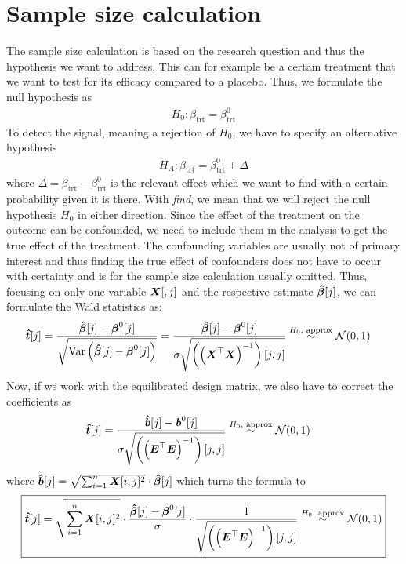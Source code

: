 \documentclass[11pt,a4paper,twoside]{book}\usepackage[]{graphicx}\usepackage[]{xcolor}
\begin{document}
\section{Sample size calculation}
The sample size calculation is based on the research question and thus the hypothesis we want to address. This can for example be a certain treatment that we want to test for its efficacy compared to a placebo. Thus, we formulate the null hypothesis as
\begin{align*}
H_0:\beta_\text{trt}=\beta_\text{trt}^0
\end{align*}
To detect the signal, meaning a rejection of $H_0$, we have to specify an alternative hypothesis
\begin{align*}
H_A:\beta_\text{trt}=\beta_\text{trt}^0+\Delta
\end{align*}
where $\Delta=\beta_\text{trt}-\beta_\text{trt}^0$ is the relevant effect which we want to find with a certain probability given it is there.
With \textit{find}, we mean that we will reject the null hypothesis $H_0$ in either direction. Since the effect of the treatment on the outcome can be confounded, we need to include them in the analysis to get the true effect of the treatment. The confounding variables are usually not of primary interest and thus finding the true effect of confounders does not have to occur with certainty and is for the sample size calculation usually omitted. Thus, focusing on only one variable ${\boldsymbol{X}}[,j]$ and the respective estimate ${\boldsymbol{\hat\beta}}[j]$, we can formulate the Wald statistics as:
\begin{align*}
{\boldsymbol{\hat{t}}}[j]&=\frac{{\boldsymbol{\hat\beta}}[j] - {\boldsymbol{\beta}}^0[j]}{\sqrt{\operatorname{Var}\left({\boldsymbol{\hat\beta}}[j]-{\boldsymbol{\beta}}^0[j]\right)}}=\frac{{\boldsymbol{\hat\beta}}[j] - {\boldsymbol{\beta}}^0[j]}{\sigma\sqrt{ \left(\left({\boldsymbol{X}}^\top{\boldsymbol{X}}\right)^{-1}\right)[j,j] }}\overset{H_0,\text{ approx}}{\sim}\operatorname{\mathcal{N}}(0,1)
\end{align*}
Now, if we work with the equilibrated design matrix, we also have to correct the coefficients as
\begin{align*}
{\boldsymbol{\hat{t}}}[j]&=\frac{{\boldsymbol{\hat{{b}}}}[j] - {\textbf{\textit{b}}}^0[j]}{\sigma\sqrt{ \left(\left({\boldsymbol{E}}^\top{\boldsymbol{E}}\right)^{-1}\right)[j,j] }}\overset{H_0,\text{ approx}}{\sim}\operatorname{\mathcal{N}}(0,1)
\end{align*}
where ${\boldsymbol{\hat{{b}}}}[j]=\sqrt{\sum_{i=1}^{n}{\boldsymbol{X}}[i,j]^2}\cdot {\boldsymbol{\hat\beta}}[j]$ which turns the formula to
\begin{align}
\boxed{
{\boldsymbol{\hat{t}}}[j] =\sqrt{\sum_{i=1}^{n}{\boldsymbol{X}}[i,j]^2}\cdot\frac{{\boldsymbol{\hat\beta}}[j]-{\boldsymbol{\beta}}^0[j]}{\sigma}\cdot \frac{1}{\sqrt{ \left(\left({\boldsymbol{E}}^\top{\boldsymbol{E}}\right)^{-1}\right)[j,j] }}\overset{H_0,\text{ approx}}{\sim}\operatorname{\mathcal{N}}(0,1)
}\label{eq:power_normal}
\end{align}
\end{document}
